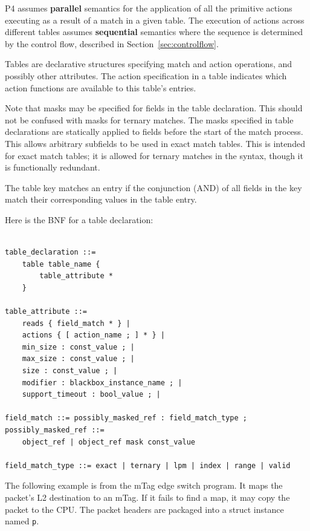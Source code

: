\documentclass[12pt]{article}
\begin{document}
P4 assumes \textbf{parallel} semantics for the application of all the 
primitive actions executing as a result of a match in a given table. The
execution of actions across different tables assumes \textbf{sequential} 
semantics where the sequence is determined by the control flow, described 
in Section~\ref{sec:controlflow}.


Tables are declarative structures specifying match and action operations, and
possibly other attributes. The action specification in a table indicates which
action functions are available to this table's entries.

Note that masks may be specified for fields in the table declaration. This 
should not be confused with masks for ternary matches. The masks specified 
in table declarations are statically applied to fields before the start of 
the match process. This allows arbitrary subfields to be used in exact match 
tables. This is intended for exact match tables; it is allowed for ternary 
matches in the syntax, though it is functionally redundant.

The table key matches an entry if the conjunction (AND) of all fields in
the key match their corresponding values in the table entry.

Here is the BNF for a table declaration:

\begin{lstlisting}[style=BNFstyle]

table_declaration ::=
    table table_name {
        table_attribute *
    }

table_attribute ::=
    reads { field_match * } |
    actions { [ action_name ; ] * } |
    min_size : const_value ; |
    max_size : const_value ; |
    size : const_value ; |
    modifier : blackbox_instance_name ; |
    support_timeout : bool_value ; |

field_match ::= possibly_masked_ref : field_match_type ;
possibly_masked_ref ::= 
    object_ref | object_ref mask const_value

field_match_type ::= exact | ternary | lpm | index | range | valid

\end{lstlisting}

The following example is from the mTag edge switch program.  It maps the
packet's L2 destination to an mTag. If it fails to find a map, it may copy the
packet to the CPU. The packet headers are packaged into a struct instance named
\texttt{p}.
\end{document}
